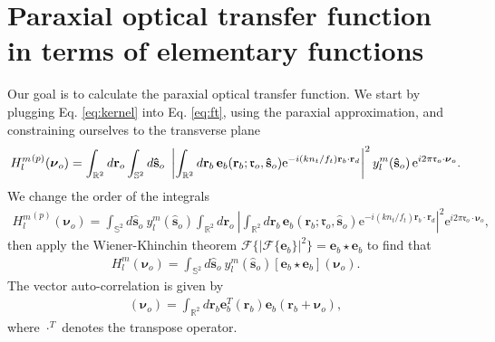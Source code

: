 \documentclass[11pt]{article}
\newcommand{\me}{\mathrm{e}}
\providecommand{\mb}[1]{\mathbf{#1}}
\providecommand{\ro}[1]{\mathbf{\mathfrak{r}}_o}
\providecommand{\so}[1]{\mathbf{\hat{s}}_o}
\providecommand{\rb}[1]{\mathbf{r}_b}
\providecommand{\rd}[1]{\mathbf{r}_d}
\providecommand{\bs}[1]{\boldsymbol{#1}}
\begin{document}
\section{Paraxial optical transfer function in terms of elementary functions}
Our goal is to calculate the paraxial optical transfer function. We start by
plugging Eq. \ref{eq:kernel} into Eq. \ref{eq:ft}, using the paraxial
approximation, and constraining ourselves to the transverse plane
\begin{align}
  {H_l^m}^{(p)}(\bs{\nu}_o) = \int_{\mathbb{R}^2}d\mb{r}_o{} \int_{\mathbb{S}^2}d\so{}\ \left|\int_{\mathbb{R}^2} d\rb{}\, \mb{e}_b(\rb{}; \ro{}, \so{})\me^{-i (kn_t/f_t) \rb{} \cdot \rd{}}\right|^2
 y_l^m(\so{})\thinspace\me^{i 2\pi \ro{}\cdot\bs{\nu}_o}\label{eq:ft2}.
\end{align}
We change the order of the integrals
\begin{align}
  {H_l^m}^{(p)}(\bs{\nu}_o) = \int_{\mathbb{S}^2}d\so{}\ y_l^m(\so{}) \int_{\mathbb{R}^2}d\mb{r}_o\ \left|\int_{\mathbb{R}^2} d\rb{}\, \mb{e}_b(\rb{}; \ro{}, \so{})\me^{-i (kn_t/f_t) \rb{} \cdot \rd{}}\right|^2 \me^{i 2\pi \ro{}\cdot\bs{\nu}_o}, 
\end{align}
then apply the Wiener-Khinchin theorem
$\mathcal{F}\{|\mathcal{F}\{\mb{e}_b\}|^2\} = \mb{e}_b \star \mb{e}_b$ to find
that
\begin{align}
  H_l^m(\bs{\nu}_o) = \int_{\mathbb{S}^2}d\so{}\ y_l^m(\so{}) \left[\mb{e}_b \star \mb{e}_b\right](\bs{\nu}_o). 
\end{align}
The vector auto-correlation is given by
\begin{align}
[\mb{e}_b \star \mb{e}_b](\bs{\nu}_o) = \int_{\mathbb{R}^2}d\bs{r}_b \mb{e}_b^{T}(\bs{r}_b)\mb{e}_b(\bs{r}_b + \bs{\nu}_o),
\end{align}
where $\cdot^T$ denotes the transpose operator. 
\end{document}
